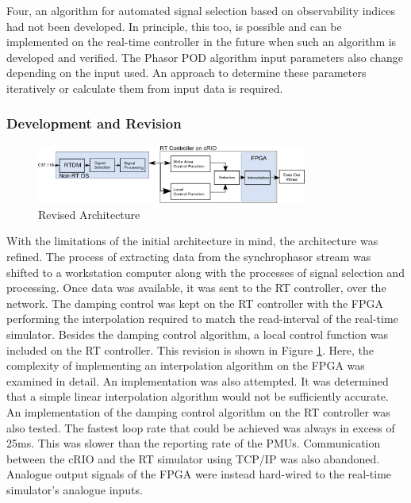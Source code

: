 \documentclass[conference]{IEEEtran}
\begin{document}
Four, an algorithm for automated signal selection based on observability indices had not been developed. In principle, this too, is possible and can be implemented on the real-time controller in the future when such an algorithm is developed and verified. The Phasor POD algorithm input parameters also change depending on the input used. An approach to determine these parameters iteratively or calculate them from input data is required. %

\subsubsection{Development and Revision}
\begin{figure}[htb]
\centering
\includegraphics[width=3.5in]{Revision.png}
\vspace{-0.5em}
\caption{Revised Architecture}
\label{fig:Revision}
\end{figure}

With the limitations of the initial architecture in mind, the architecture was refined. The process of  extracting data from the synchrophasor stream was shifted to a workstation computer along with the processes of signal selection and processing. Once data was available, it was sent to the RT controller, over the  network. The damping control was kept on the RT controller with the FPGA performing the interpolation required to match the read-interval of the real-time simulator. Besides the damping control algorithm, a local control function was included on the RT controller. This revision is shown in Figure \ref{fig:Revision}. Here, the complexity of implementing an interpolation algorithm on the FPGA was examined in detail. An implementation was also attempted. It was determined that a simple linear interpolation algorithm would not be sufficiently accurate. An implementation of the damping control algorithm on the RT controller was also tested. The fastest loop rate that could be achieved was always in excess of 25ms. This was slower than the reporting rate of the PMUs. Communication between the cRIO and the RT simulator using TCP/IP was also abandoned. Analogue output signals of the FPGA were instead hard-wired to the real-time simulator's analogue inputs.
\end{document}
